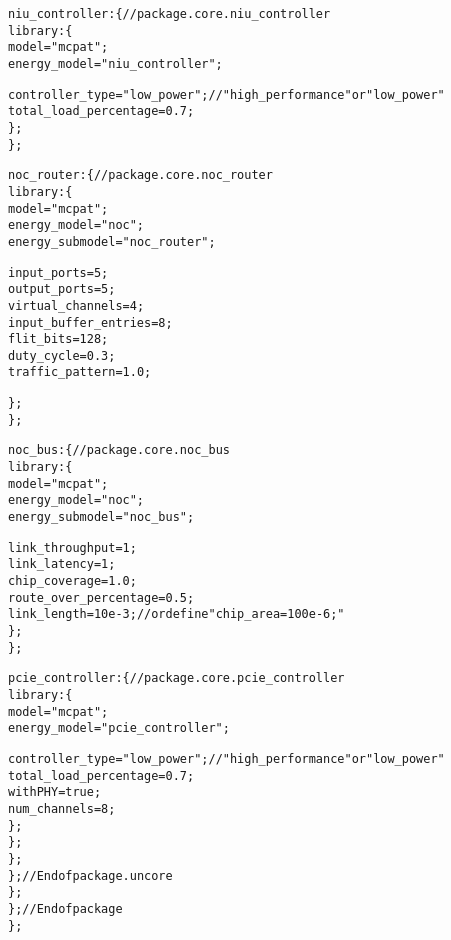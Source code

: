 {\begin{alltt}
                    niu\_controller: \{ // package.core.niu\_controller
                        library: \{
                            model = "mcpat";
                            energy_model = "niu_controller";
                            
                            controller_type = "low_power"; // "high_performance" or "low_power"
                            total_load_percentage = 0.7;
                        \};
                    \};
                    
                    noc\_router: \{ // package.core.noc\_router
                        library: \{
                            model = "mcpat";
                            energy_model = "noc";
                            energy_submodel = "noc_router";
                            
                            input_ports = 5;
                            output_ports = 5;
                            virtual_channels = 4;
                            input_buffer_entries = 8;
                            flit_bits = 128;
                            duty_cycle = 0.3;
                            traffic_pattern = 1.0;
                            
                        \};
                    \};
                    
                    noc\_bus: \{ // package.core.noc\_bus
                        library: \{
                            model = "mcpat";
                            energy_model = "noc";
                            energy_submodel = "noc_bus";
                            
                            link_throughput = 1;
                            link_latency = 1;
                            chip_coverage = 1.0;
                            route_over_percentage = 0.5;
                            link_length = 10e-3; // or define "chip_area = 100e-6;"
                        \};
                    \};
                    
                    pcie\_controller: \{ // package.core.pcie\_controller
                        library: \{
                            model = "mcpat";
                            energy_model = "pcie_controller";
                            
                            controller_type = "low_power"; // "high_performance" or "low_power"
                            total_load_percentage = 0.7;
                            withPHY = true;
                            num_channels = 8;
                        \};
                    \};
                \};
            \}; // End of package.uncore
        \};
    \}; // End of package
\};
\end{alltt}
}

